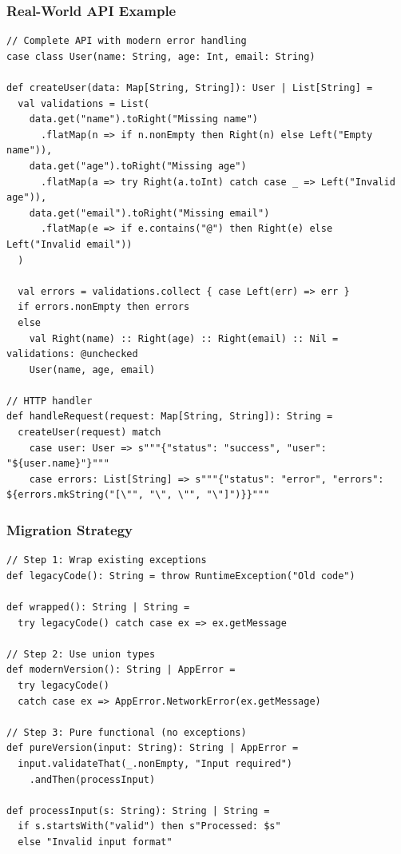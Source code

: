 \documentclass{beamer}
\begin{document}
\begin{frame}[fragile]
\frametitle{Real-World API Example}

\begin{lstlisting}[style=scalaStyle]
// Complete API with modern error handling
case class User(name: String, age: Int, email: String)

def createUser(data: Map[String, String]): User | List[String] =
  val validations = List(
    data.get("name").toRight("Missing name")
      .flatMap(n => if n.nonEmpty then Right(n) else Left("Empty name")),
    data.get("age").toRight("Missing age")
      .flatMap(a => try Right(a.toInt) catch case _ => Left("Invalid age")),
    data.get("email").toRight("Missing email")
      .flatMap(e => if e.contains("@") then Right(e) else Left("Invalid email"))
  )

  val errors = validations.collect { case Left(err) => err }
  if errors.nonEmpty then errors
  else 
    val Right(name) :: Right(age) :: Right(email) :: Nil = validations: @unchecked
    User(name, age, email)

// HTTP handler
def handleRequest(request: Map[String, String]): String =
  createUser(request) match
    case user: User => s"""{"status": "success", "user": "${user.name}"}"""
    case errors: List[String] => s"""{"status": "error", "errors": ${errors.mkString("[\"", "\", \"", "\"]")}}"""
\end{lstlisting}

\end{frame}

\begin{frame}[fragile]
\frametitle{Migration Strategy}

\begin{lstlisting}[style=scalaStyle]
// Step 1: Wrap existing exceptions
def legacyCode(): String = throw RuntimeException("Old code")

def wrapped(): String | String = 
  try legacyCode() catch case ex => ex.getMessage

// Step 2: Use union types
def modernVersion(): String | AppError =
  try legacyCode() 
  catch case ex => AppError.NetworkError(ex.getMessage)

// Step 3: Pure functional (no exceptions)
def pureVersion(input: String): String | AppError =
  input.validateThat(_.nonEmpty, "Input required")
    .andThen(processInput)

def processInput(s: String): String | String = 
  if s.startsWith("valid") then s"Processed: $s"
  else "Invalid input format"
\end{lstlisting}

\end{frame}
\end{document}
